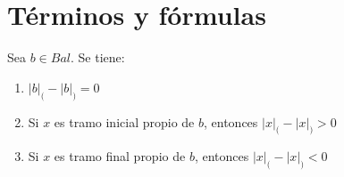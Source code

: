 \section{Términos y fórmulas}

  \begin{lemma}
    \PN Sea $b \in Bal$. Se tiene:
    \begin{enumerate}[(1)]
      \item $\lvert b \rvert_{(} - \lvert b \rvert_{)} = 0$
      \item Si $x$ es tramo inicial propio de $b$, entonces $\lvert x \rvert_{(} - \lvert x \rvert_{)} > 0$
      \item Si $x$ es tramo final propio de $b$, entonces $\lvert x \rvert_{(} - \lvert x \rvert_{)} < 0$
    \end{enumerate}
  \end{lemma}
